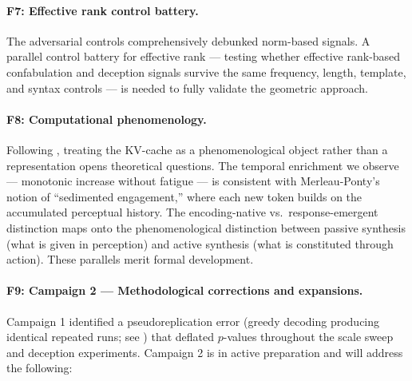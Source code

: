 \documentclass[11pt,a4paper]{article}
\begin{document}
\paragraph{F7: Effective rank control battery.} The adversarial controls comprehensively debunked norm-based signals. A parallel control battery for effective rank --- testing whether effective rank-based confabulation and deception signals survive the same frequency, length, template, and syntax controls --- is needed to fully validate the geometric approach.

\paragraph{F8: Computational phenomenology.} Following \citet{butlin2023consciousness}, treating the KV-cache as a phenomenological object rather than a representation opens theoretical questions. The temporal enrichment we observe --- monotonic increase without fatigue --- is consistent with Merleau-Ponty's notion of ``sedimented engagement,'' where each new token builds on the accumulated perceptual history. The encoding-native vs.\ response-emergent distinction maps onto the phenomenological distinction between passive synthesis (what is given in perception) and active synthesis (what is constituted through action). These parallels merit formal development.

\paragraph{F9: Campaign 2 --- Methodological corrections and expansions.} Campaign 1 identified a pseudoreplication error (greedy decoding producing identical repeated runs; see ) that deflated $p$-values throughout the scale sweep and deception experiments. Campaign 2 is in active preparation and will address the following:
\end{document}

